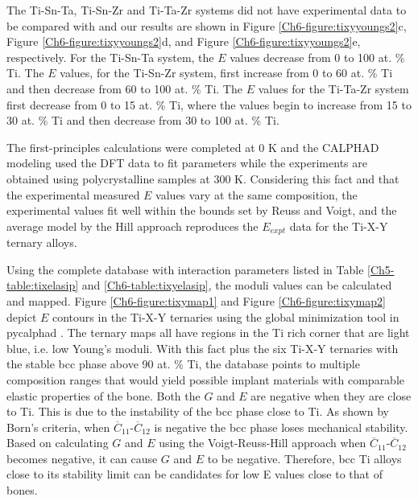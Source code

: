 The Ti-Sn-Ta, Ti-Sn-Zr and Ti-Ta-Zr systems did not have experimental data to be compared with and our results are shown in Figure \ref{Ch6-figure:tixyyoungs2}c, Figure \ref{Ch6-figure:tixyyoungs2}d, and Figure \ref{Ch6-figure:tixyyoungs2}e, respectively. For the Ti-Sn-Ta system, the $E$ values decrease from 0 to 100 at. \% Ti. The $E$ values, for the Ti-Sn-Zr system, first increase from 0 to 60 at. \% Ti and then decrease from 60 to 100 at. \% Ti. The $E$ values for the Ti-Ta-Zr system first decrease from 0 to 15 at. \% Ti, where the values begin to increase from 15 to 30 at. \% Ti and then decrease from 30 to 100 at. \% Ti. 

The first-principles calculations were completed at 0 K and the CALPHAD modeling used the DFT data to fit parameters while the experiments are obtained using polycrystalline samples at 300 K. Considering this fact and that the experimental measured $E$ values vary at the same composition, the experimental values fit well within the bounds set by Reuss and Voigt, and the average model by the Hill approach reproduces the $E_{expt}$ data for the Ti-X-Y ternary alloys.  

Using the complete database with interaction parameters listed in Table \ref{Ch5-table:tixelasip} and \ref{Ch6-table:tixyelasip}, the moduli values can be calculated and mapped. Figure \ref{Ch6-figure:tixymap1} and Figure \ref{Ch6-figure:tixymap2} depict $E$ contours in the Ti-X-Y ternaries using the global minimization tool in pycalphad \cite{Otis2017}. The ternary maps all have regions in the Ti rich corner that are light blue, i.e. low Young's moduli. With this fact plus the six Ti-X-Y ternaries with the stable bcc phase above 90 at. \% Ti, the database points to multiple composition ranges that would yield possible implant materials with comparable elastic properties of the bone. Both the $G$ and $E$ are negative when they are close to Ti. This is due to the instability of the bcc phase close to Ti. As shown by Born's criteria, when $\overline{C}_{11}$-$\overline{C}_{12}$ is negative the bcc phase loses mechanical stability. Based on calculating $G$ and $E$ using the Voigt-Reuss-Hill approach when $\overline{C}_{11}$-$\overline{C}_{12}$ becomes negative, it can cause $G$ and $E$ to be negative. Therefore, bcc Ti alloys close to its stability limit can be candidates for low E values close to that of bones. 

